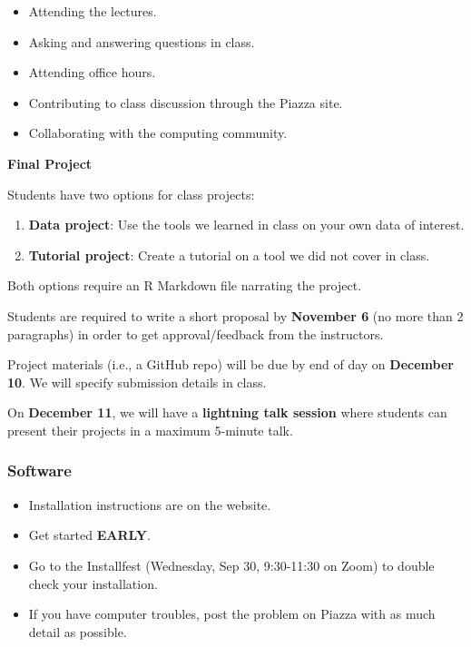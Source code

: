 \documentclass[]{book}
\providecommand{\tightlist}{%
  \setlength{\itemsep}{0pt}\setlength{\parskip}{0pt}}
\begin{document}
\begin{itemize}
\tightlist
\item
  Attending the lectures.
\item
  Asking and answering questions in class.
\item
  Attending office hours.
\item
  Contributing to class discussion through the Piazza site.
\item
  Collaborating with the computing community.
\end{itemize}

\textbf{Final Project}

Students have two options for class projects:

\begin{enumerate}
\def\labelenumi{\arabic{enumi}.}
\item
  \textbf{Data project}: Use the tools we learned in class on your own
  data of interest.
\item
  \textbf{Tutorial project}: Create a tutorial on a tool we did not
  cover in class.
\end{enumerate}

Both options require an R Markdown file narrating the project.

Students are required to write a short proposal by \textbf{November 6}
(no more than 2 paragraphs) in order to get approval/feedback from the
instructors.

Project materials (i.e., a GitHub repo) will be due by end of day on
\textbf{December 10}. We will specify submission details in class.

On \textbf{December 11}, we will have a \textbf{lightning talk session}
where students can present their projects in a maximum 5-minute talk.

\subsubsection*{Software}\label{software}

\begin{itemize}
\tightlist
\item
  Installation instructions are on the website.
\item
  Get started \textbf{EARLY}.
\item
  Go to the Installfest (Wednesday, Sep 30, 9:30-11:30 on Zoom) to
  double check your installation.
\item
  If you have computer troubles, post the problem on Piazza with as much
  detail as possible.
\end{itemize}
\end{document}
